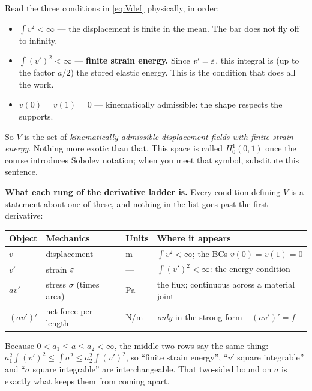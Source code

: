 \begin{intuition}
Read the three conditions in \eqref{eq:Vdef} physically, in order:
\begin{itemize}[leftmargin=1.4em,itemsep=2pt]
  \item $\int v^{2}<\infty$ --- the displacement is finite in the mean. The bar
        does not fly off to infinity.
  \item $\int (v')^{2}<\infty$ --- \textbf{finite strain energy.} Since
        $v'=\varepsilon$, this integral is (up to the factor $a/2$) the stored elastic
        energy. This is the condition that does all the work.
  \item $v(0)=v(1)=0$ --- kinematically admissible: the shape respects the
        supports.
\end{itemize}
So $V$ is the set of \emph{kinematically admissible displacement fields with
finite strain energy}. Nothing more exotic than that. This space is called
$H^{1}_{0}(0,1)$ once the course introduces Sobolev notation; when you meet that
symbol, substitute this sentence.

\medskip
\noindent\textbf{What each rung of the derivative ladder is.}
Every condition defining $V$ is a statement about one of these, and nothing in
the list goes past the first derivative:
\begin{center}\small
\renewcommand{\arraystretch}{1.15}
\begin{tabular}{@{}llll@{}}
\toprule
\textbf{Object} & \textbf{Mechanics} & \textbf{Units} & \textbf{Where it appears}\\
\midrule
$v$          & displacement            & m       & $\int v^{2}<\infty$; the BCs $v(0)=v(1)=0$\\
$v'$         & strain $\varepsilon$           & ---     & $\int (v')^{2}<\infty$: the energy condition\\
$a v'$       & stress $\sigma$ (times area) & Pa & the flux; continuous across a material joint\\
$(a v')'$    & net force per length    & N/m     & \emph{only} in the strong form $-(av')'=f$\\
\bottomrule
\end{tabular}
\end{center}

\noindent
Because $0<a_{1}\le a\le a_{2}<\infty$, the middle two rows say the same thing:
$a_{1}^{2}\int(v')^{2}\le\int\sigma^{2}\le a_{2}^{2}\int(v')^{2}$, so ``finite
strain energy'', ``$v'$ square integrable'' and ``$\sigma$ square integrable''
are interchangeable. That two-sided bound on $a$ is exactly what keeps them
from coming apart.


\end{intuition}
